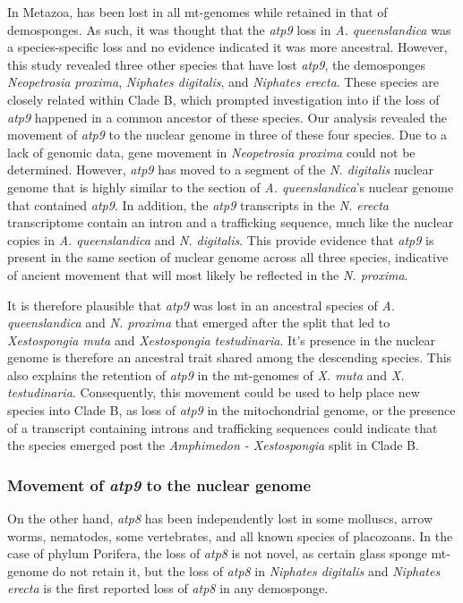 \documentclass[../main.tex]{subfiles}
\begin{document}
In Metazoa,  has been lost in all mt-genomes while retained in that of demosponges. As such, it was thought that the \emph{atp9} loss in \emph{A. queenslandica} was a species-specific loss and no evidence indicated it was more ancestral. However, this study revealed three other species that have lost \emph{atp9}, the demosponges \emph{Neopetrosia proxima}, \emph{Niphates digitalis}, and \emph{Niphates erecta}. These species are closely related within Clade B, which prompted investigation into if the loss of \emph{atp9} happened in a common ancestor of these species. Our analysis revealed the movement of \emph{atp9} to the nuclear genome in three of these four species. Due to a lack of genomic data, gene movement in \emph{Neopetrosia proxima} could not be determined. However, \emph{atp9} has moved to a segment of the \emph{N. digitalis} nuclear genome that is highly similar to the section of \emph{A. queenslandica}'s nuclear genome that contained \emph{atp9}. In addition, the \emph{atp9} transcripts in the \emph{N. erecta} transcriptome contain an intron and a trafficking sequence, much like the nuclear copies in \emph{A. queenslandica} and \emph{N. digitalis}. This provide evidence that \emph{atp9} is present in the same section of nuclear genome across all three species, indicative of ancient movement that will most likely be reflected in the \emph{N. proxima}.

It is therefore plausible that \emph{atp9} was lost in an ancestral species of \emph{A. queenslandica} and \emph{N. proxima} that emerged after the split that led to \emph{Xestospongia muta} and \emph{Xestospongia testudinaria}. It's presence in the nuclear genome is therefore an ancestral trait shared among the descending species. This also explains the retention of \emph{atp9} in the mt-genomes of \emph{X. muta} and \emph{X. testudinaria}. Consequently, this movement could be used to help place new species into Clade B, as loss of \emph{atp9} in the mitochondrial genome, or the presence of a transcript containing introns and trafficking sequences could indicate that the species emerged post the \emph{Amphimedon - Xestospongia} split in Clade B. 

\subsubsection{Movement of \emph{atp9} to the nuclear genome}
On the other hand, \emph{atp8} has been independently lost in some molluscs, arrow worms, nematodes, some vertebrates, and all known species of placozoans. In the case of phylum Porifera, the loss of \emph{atp8} is not novel, as certain glass sponge mt-genome do not retain it, but the loss of \emph{atp8} in \emph{Niphates digitalis} and \emph{Niphates erecta} is the first reported loss of \emph{atp8} in any demosponge. 
\end{document}
